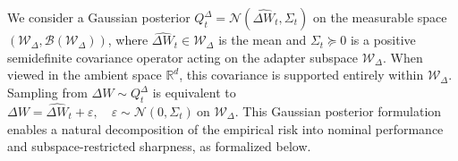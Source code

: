 \documentclass{article} %
\begin{document}



 

We consider a Gaussian posterior \( Q_t^{\Delta} = \mathcal{N}(\hat{\Delta W}_t, \Sigma_t) \) on the measurable space \( (\mathcal{W}_\Delta, \mathcal{B}(\mathcal{W}_\Delta)) \), where \( \hat{\Delta W}_t \in \mathcal{W}_\Delta \) is the mean and \( \Sigma_t \succeq 0 \) is a positive semidefinite covariance operator acting on the adapter subspace \( \mathcal{W}_\Delta \). When viewed in the ambient space \( \mathbb{R}^d \), this covariance is supported entirely within \( \mathcal{W}_\Delta \). Sampling from \( \Delta W \sim Q_t^{\Delta} \) is equivalent to 
$
\Delta W = \hat{\Delta W}_t + \varepsilon, \quad \varepsilon \sim \mathcal{N}(0, \Sigma_t) \ \text{on } \mathcal{W}_\Delta.
$ This Gaussian posterior formulation enables a natural decomposition of the empirical risk into nominal performance and subspace-restricted sharpness, as formalized below.
\end{document}
